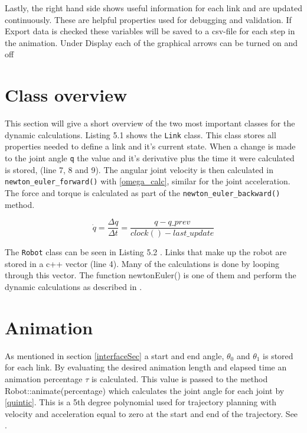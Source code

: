 Lastly, the right hand side shows useful information for each link and are updated continuously. These are helpful properties used for debugging and validation. If \textsf{Export data} is checked these variables will be saved to a csv-file for each step in the animation. Under \textsf{Display} each of the graphical arrows can be turned on and off

\section{Class overview}

This section will give a short overview of the two most important classes for the dynamic calculations. Listing 5.1  shows the \texttt{Link} class. This class stores all properties needed to define a link and it's current state. When a change is made to the joint angle \texttt{q} the value and it's derivative plus the time it were calculated is stored, (line 7, 8 and 9). The angular joint velocity is then calculated in \texttt{newton\_euler\_forward()} with \eqref{omega_calc}, similar for the joint acceleration. The force and torque is calculated as part of the \texttt{newton\_euler\_backward()} method.


\label{Link}

\begin{equation}\label{omega_calc}
\dot{q} = \frac{\Delta q}{\Delta t}=\frac{q-q\_prev}{clock()-last\_update}
\end{equation}

\label{Robot}

The \texttt{Robot} class can be seen in Listing 5.2 . Links that make up the robot are stored in a c++ vector (line 4). Many of the calculations is done by looping through this vector. The function \textsf{newtonEuler()} is one of them and perform the dynamic calculations as described in .

\section{Animation}

As mentioned in section \ref{interfaceSec} a start and end angle, $\theta_0$ and $\theta_1$ is stored for each link. By evaluating the desired animation length and elapsed time an animation percentage $\tau$ is calculated. This value is passed to the method \textsf{Robot::animate(percentage)} which calculates the joint angle for each joint by \eqref{quintic}. This is a 5th degree polynomial used for trajectory planning with velocity and acceleration equal to zero at the start and end of the trajectory. See .

